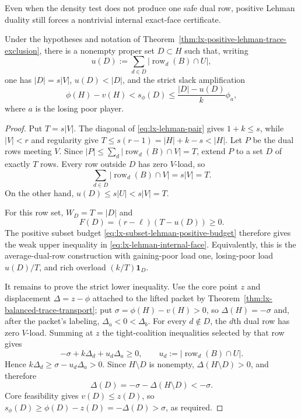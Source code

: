 Even when the density test does not produce one safe dual row, positive
Lehman duality still forces a nontrivial internal exact-face certificate.

\begin{corollary}
\label{cor:lx-lehman-internal-face}
Under the hypotheses and notation of
Theorem~\ref{thm:lx-positive-lehman-trace-exclusion}, there is a nonempty
proper set $D\subset H$ such that, writing
\[
 u(D):=\sum_{d\in D}|\operatorname{row}_d(B)\cap U|,
 \]
one has $|D|=s|V|$, $u(D)<|D|$, and the strict slack amplification
\[
 \phi(H)-v(H)<s_\phi(D)
 \leq\frac{|D|-u(D)}{k}\phi_a,                      \tag{LH-F}
 \label{eq:lx-lehman-internal-face}
\]
where $a$ is the losing poor player.
\end{corollary}

\begin{proof}
Put $T=s|V|$.  The diagonal of
\eqref{eq:lx-lehman-pair} gives $1+k\leq s$, while $|V|<r$ and regularity
give
$T\leq s(r-1)=|H|+k-s<|H|$.  Let $P$ be the dual rows meeting $V$.
Since $|P|\leq\sum_d|\operatorname{row}_d(B)\cap V|=T$, extend $P$ to a
set $D$ of exactly $T$ rows.  Every row outside $D$ has zero $V$-load, so
\[
 \sum_{d\in D}|\operatorname{row}_d(B)\cap V|=s|V|=T.
\]
On the other hand,
$u(D)\leq s|U|<s|V|=T$.

For this row set, $W_D=T=|D|$ and
\[
 F(D)=(r-\ell)(T-u(D))\geq0.
\]
The positive subset budget
\eqref{eq:lx-subset-lehman-positive-budget} therefore gives the weak upper
inequality in \eqref{eq:lx-lehman-internal-face}.  Equivalently, this is the
average-dual-row construction with gaining-poor load one, losing-poor load
$u(D)/T$, and rich overload $(k/T)\mathbf1_D$.

It remains to prove the strict lower inequality.  Use the core point $z$ and
displacement $\Delta=z-\phi$ attached to the lifted packet by
Theorem~\ref{thm:lx-balanced-trace-transport}; put
$\sigma=\phi(H)-v(H)>0$, so
$\Delta(H)=-\sigma$ and, after the packet's labeling,
$\Delta_a<0<\Delta_b$.  For every $d\notin D$, the $d$th dual row has
zero $V$-load.  Summing at $z$ the tight-coalition inequalities selected by
that row gives
\[
 -\sigma+k\Delta_d+u_d\Delta_a\geq0,
 \qquad
 u_d:=|\operatorname{row}_d(B)\cap U|.
\]
Hence $k\Delta_d\geq\sigma-u_d\Delta_a>0$.  Since $H\setminus D$ is
nonempty, $\Delta(H\setminus D)>0$, and therefore
\[
 \Delta(D)=-\sigma-\Delta(H\setminus D)<-\sigma.
\]
Core feasibility gives $v(D)\leq z(D)$, so
$s_\phi(D)\geq\phi(D)-z(D)=-\Delta(D)>\sigma$, as required.
\end{proof}

